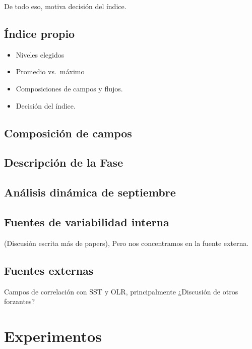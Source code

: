 \documentclass[es-AR,]{tufte-book}
\providecommand{\tightlist}{%
  \setlength{\itemsep}{0pt}\setlength{\parskip}{0pt}}
\begin{document}
De todo eso, motiva decisión del índice.

\section{Índice propio}\label{indice-propio}

\begin{itemize}
\tightlist
\item
  Niveles elegidos
\item
  Promedio vs.~máximo
\item
  Composiciones de campos y flujos.
\item
  Decisión del índice.
\end{itemize}

\section{Composición de campos}\label{composicion-de-campos}

\section{Descripción de la Fase}\label{descripcion-de-la-fase}

\section{Análisis dinámica de
septiembre}\label{analisis-dinamica-de-septiembre}

\section{Fuentes de variabilidad
interna}\label{fuentes-de-variabilidad-interna}

(Discusión escrita más de papers), Pero nos concentramos en la fuente
externa.

\section{Fuentes externas}\label{fuentes-externas}

Campos de correlación con SST y OLR, principalmente ¿Discusión de otros
forzantes?

\chapter{Experimentos}\label{experimentos}
\end{document}
